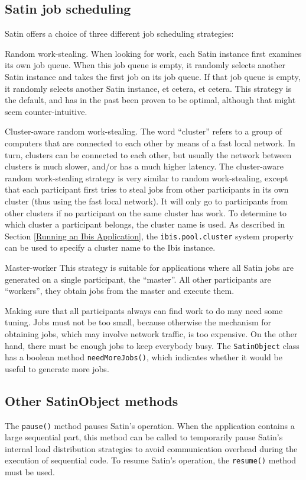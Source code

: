 \documentclass[10pt]{article}
\newcommand{\mysubsection}[1]{\subsection{#1}\label{#1}}
\begin{document}
\mysubsection{Satin job scheduling}

Satin offers a choice of three different job scheduling strategies:
\begin{description}
\item{Random work-stealing}.
When looking for work, each Satin instance
first examines its own job queue. When this job queue is empty,
it randomly selects another Satin instance and takes the first job on its job queue.
If that job queue is empty, it randomly selects another Satin instance, et cetera,
et cetera.  This strategy is the default, and has in the past been proven
to be optimal, although that might seem counter-intuitive.

\item{Cluster-aware random work-stealing}.
The word ``cluster'' refers to a group of computers that are connected
to each other by means of a fast local network.
In turn, clusters can be connected to each other, but usually the
network between clusters is much slower, and/or has a much higher latency.
The cluster-aware random work-stealing strategy
is very similar to random work-stealing, except that
each participant first tries to steal jobs from other participants in its
own cluster (thus using the fast local network).
It will only go to participants from other clusters if no participant on the
same cluster has work.
To determine to which cluster a participant belongs, the cluster name
is used.
As described in Section \ref{Running an Ibis Application},
the \texttt{ibis.pool.cluster} system property can be used to
specify a cluster name to the Ibis instance.

\item{Master-worker}
This strategy is suitable for applications where all Satin jobs are
generated on a single participant, the ``master''. All other participants
are ``workers'', they obtain jobs from the master and execute them.
\end{description}

Making sure that all participants always can find work to do may need
some tuning. Jobs must not be too small, because otherwise the mechanism
for obtaining jobs, which may involve network traffic, is too expensive.
On the other hand, there must be enough jobs to keep everybody busy.
The \texttt{SatinObject} class has a boolean method \texttt{needMoreJobs()},
which indicates whether it would be useful to generate more jobs.

\mysubsection{Other SatinObject methods}

The \texttt{pause()} method pauses Satin's operation. When the application
contains a large sequential part, this method can be called to temporarily
pause Satin's internal load distribution strategies to avoid communication
overhead during the execution of sequential code.
To resume Satin's operation, the \texttt{resume()} method must be used.
\end{document}
